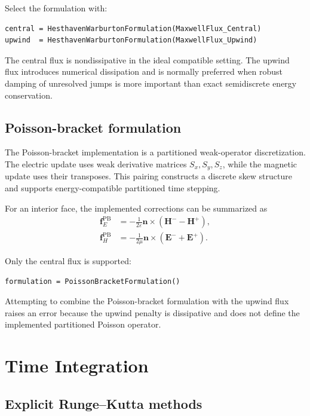 \documentclass[11pt,oneside]{book}
\newcommand{\vect}[1]{\boldsymbol{#1}}
\begin{document}
Select the formulation with:

\begin{lstlisting}
central = HesthavenWarburtonFormulation(MaxwellFlux_Central)
upwind  = HesthavenWarburtonFormulation(MaxwellFlux_Upwind)
\end{lstlisting}

The central flux is nondissipative in the ideal compatible setting. The
upwind flux introduces numerical dissipation and is normally preferred when
robust damping of unresolved jumps is more important than exact semidiscrete
energy conservation.

\section{Poisson-bracket formulation}

The Poisson-bracket implementation is a partitioned weak-operator
discretization. The electric update uses weak derivative matrices
$S_x,S_y,S_z$, while the magnetic update uses their transposes. This pairing
constructs a discrete skew structure and supports energy-compatible
partitioned time stepping.

For an interior face, the implemented corrections can be summarized as
\begin{align}
  \vect f_E^{\mathrm{PB}}
    &= -\frac{1}{2\varepsilon}
       \vect n\times(\vect H^- - \vect H^+),\\
  \vect f_H^{\mathrm{PB}}
    &= -\frac{1}{2\mu}
       \vect n\times(\vect E^- + \vect E^+).
\end{align}

Only the central flux is supported:

\begin{lstlisting}
formulation = PoissonBracketFormulation()
\end{lstlisting}

Attempting to combine the Poisson-bracket formulation with the upwind flux
raises an error because the upwind penalty is dissipative and does not define
the implemented partitioned Poisson operator.

\chapter{Time Integration}

\section{Explicit Runge--Kutta methods}
\end{document}
